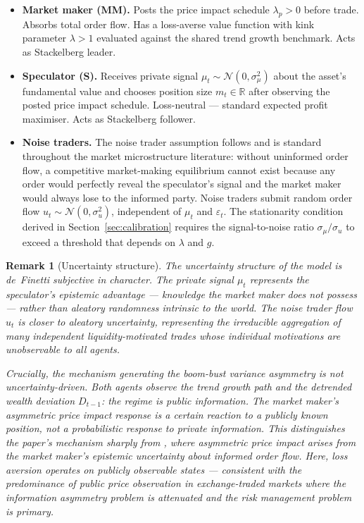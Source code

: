 \documentclass[12pt,a4paper]{article}
\newtheorem{remark}[theorem]{Remark}
\theoremstyle{definition}
\begin{document}
\begin{itemize}
  \item \textbf{Market maker (MM).} Posts the price impact schedule
    $\lambda_p > 0$ before trade. Absorbs total order flow. Has a
    loss-averse value function with kink parameter $\lambda > 1$ evaluated
    against the shared trend growth benchmark. Acts as Stackelberg leader.

  \item \textbf{Speculator (S).} Receives private signal $\mu_t \sim
    \mathcal{N}(0,\sigma^2_\mu)$ about the asset's fundamental value and
    chooses position size $m_t \in \mathbb{R}$ after observing the posted
    price impact schedule. Loss-neutral --- standard expected profit
    maximiser. Acts as Stackelberg follower.

  \item \textbf{Noise traders.} The noise trader assumption follows
    \citet{kyle1985} and is standard throughout the market microstructure
    literature: without uninformed order flow, a competitive market-making
    equilibrium cannot exist because any order would perfectly reveal the
    speculator's signal and the market maker would always lose to the
    informed party. Noise traders submit random order flow
    $u_t \sim \mathcal{N}(0,\sigma^2_u)$, independent of $\mu_t$ and
    $\varepsilon_t$. The stationarity condition derived in
    Section~\ref{sec:calibration} requires the signal-to-noise ratio
    $\sigma_\mu/\sigma_u$ to exceed a threshold that depends on $\lambda$
    and $g$.
\end{itemize}

\begin{remark}[Uncertainty structure]
\label{rem:definetti}
The uncertainty structure of the model is de~Finetti subjective in character.
The private signal $\mu_t$ represents the speculator's epistemic advantage
--- knowledge the market maker does not possess --- rather than aleatory
randomness intrinsic to the world. The noise trader flow $u_t$ is closer to
aleatory uncertainty, representing the irreducible aggregation of many
independent liquidity-motivated trades whose individual motivations are
unobservable to all agents.

Crucially, the mechanism generating the boom-bust variance asymmetry is not
uncertainty-driven. Both agents observe the trend growth path and the
detrended wealth deviation $D_{t-1}$: the regime is public information.
The market maker's asymmetric price impact response is a certain reaction
to a publicly known position, not a probabilistic response to private
information. This distinguishes the paper's mechanism sharply from
\citet{kyle1985}, where asymmetric price impact arises from the market
maker's epistemic uncertainty about informed order flow. Here, loss aversion
operates on publicly observable states --- consistent with the predominance
of public price observation in exchange-traded markets where the information
asymmetry problem is attenuated and the risk management problem is primary.
\end{remark}
\end{document}
